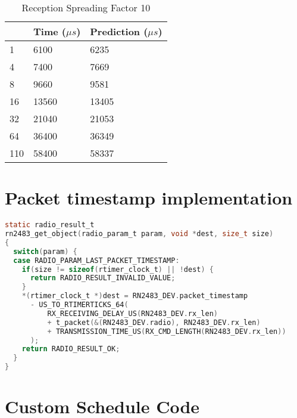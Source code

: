 \begin{table}[H]
\centering
\begin{tabular}{|l|l|l|}
\hline
\rowcolor[HTML]{C0C0C0} 
\multicolumn{1}{|c|}{\cellcolor[HTML]{C0C0C0}Bytes} & Time ($\mu s$) & Prediction ($\mu s$) \\ \hline
1                                                   & 6100      & 6235       \\ \hline
4                                                   & 7400      & 7669       \\ \hline
8                                                   & 9660      & 9581       \\ \hline
16                                                  & 13560     & 13405      \\ \hline
32                                                  & 21040     & 21053      \\ \hline
64                                                  & 36400     & 36349      \\ \hline
110                                                 & 58400     & 58337      \\ \hline
\end{tabular}
\caption{Reception Spreading Factor 10\label{table:rxsf10}}
\end{table}

\section*{Packet timestamp implementation\label{code:timestampimpl}}

\begin{lstlisting}[language=c]
static radio_result_t
rn2483_get_object(radio_param_t param, void *dest, size_t size)
{
  switch(param) {
  case RADIO_PARAM_LAST_PACKET_TIMESTAMP:
    if(size != sizeof(rtimer_clock_t) || !dest) {
      return RADIO_RESULT_INVALID_VALUE;
    }
    *(rtimer_clock_t *)dest = RN2483_DEV.packet_timestamp 
      - US_TO_RTIMERTICKS_64(
          RX_RECEIVING_DELAY_US(RN2483_DEV.rx_len)
          + t_packet(&(RN2483_DEV.radio), RN2483_DEV.rx_len)
          + TRANSMISSION_TIME_US(RX_CMD_LENGTH(RN2483_DEV.rx_len))
      );
    return RADIO_RESULT_OK;
  }
}
\end{lstlisting}



\section*{Custom Schedule Code\label{code:customsched}}

